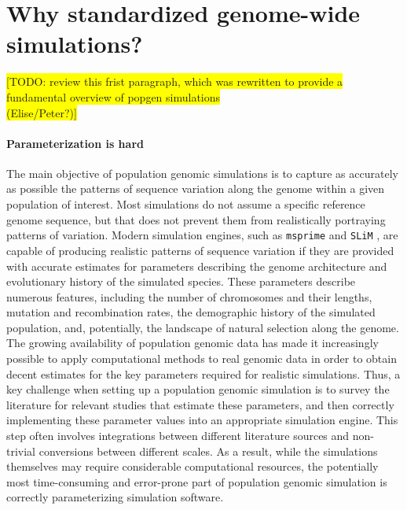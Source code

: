 \documentclass[hidelinks]{article}
\begin{document}


\hypertarget{sec2}{%
	\section*{Why standardized genome-wide simulations?}\label{sec:std-sim}}



%

\colorbox{yellow}{[TODO:  review this frist paragraph, which was rewritten to
	provide a fundamental overview of popgen simulations}\\
\colorbox{yellow}{ (Elise/Peter?)]}
	
\paragraph*{Parameterization is hard}	
The main objective of population genomic simulations is to capture as accurately as possible
the patterns of sequence variation along the genome within a given population of interest.
Most simulations do not assume a specific reference genome sequence, 
but that does not prevent them from realistically portraying patterns of variation.
Modern simulation engines, such as \texttt{msprime} \citep{Kelleher2016,Nelson2020} 
and \texttt{SLiM} \citep{Haller2019}, are capable of producing realistic patterns of sequence variation
if they are provided with accurate estimates for parameters describing the genome architecture
and evolutionary history of the simulated species. 
These parameters describe numerous features, including the number of chromosomes and their lengths,
mutation and recombination rates, the demographic history of the simulated population,
and, potentially, the landscape of natural selection along the genome. 
The growing availability of population genomic data has made it increasingly possible
to apply computational methods to real genomic data in order to obtain decent estimates
for the key parameters required for realistic simulations. 
Thus, a key challenge when setting up a population genomic simulation is to
survey the literature for relevant studies that estimate these parameters, 
and then correctly implementing these parameter values into an appropriate simulation engine.
This step often involves integrations between different literature sources and
non-trivial conversions between different scales.
As a result, while the simulations themselves may require considerable computational resources,
the potentially most time-consuming and error-prone part of population genomic simulation is
correctly parameterizing simulation software.
\end{document}
